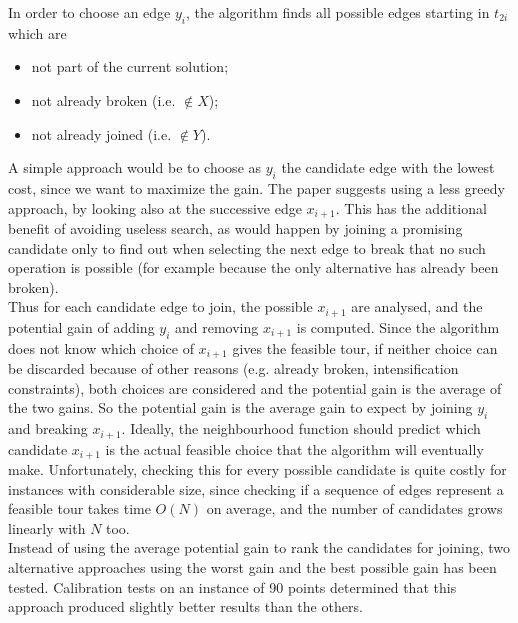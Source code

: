 In order to choose an edge $y_i$, the algorithm finds all possible edges starting in $t_{2i}$ which are
\begin{itemize}
	\setlength\itemsep{0.05em}
	\item not part of the current solution;
	\item not already broken (i.e. $\notin X$);
	\item not already joined (i.e. $\notin Y$).
\end{itemize}
A simple approach would be to choose as $y_i$ the candidate edge with the lowest cost, since we want to maximize the gain. The paper suggests using a less greedy approach, by looking also at the successive edge $x_{i+1}$. This has the additional benefit of avoiding useless search, as would happen by joining a promising candidate only to find out when selecting the next edge to break that no such operation is possible (for example because the only alternative has already been broken). \\
Thus for each candidate edge to join, the possible $x_{i+1}$ are analysed, and the potential gain of adding $y_i$ and removing $x_{i+1}$ is computed. Since the algorithm does not know which choice of $x_{i+1}$ gives the feasible tour, if neither choice can be discarded because of other reasons (e.g. already broken, intensification constraints), both choices are considered and the potential gain is the average of the two gains. So the potential gain is the average gain to expect by joining $y_i$ and breaking $x_{i+1}$. Ideally, the neighbourhood function should predict which candidate $x_{i+1}$ is the actual feasible choice that the algorithm will eventually make. Unfortunately, checking this for every possible candidate is quite costly for instances with considerable size, since checking if a sequence of edges represent a feasible tour takes time $O(N)$ on average, and the number of candidates grows linearly with $N$ too.\\
Instead of using the average potential gain to rank the candidates for joining, two alternative approaches using the worst gain and the best possible gain has been tested. Calibration tests on an instance of 90 points determined that this approach produced slightly better results than the others.

